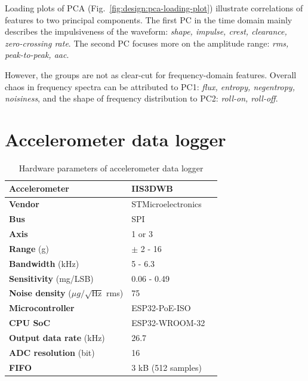 Loading plots of PCA (Fig.~\ref{fig:design:pca-loading-plot}) illustrate correlations of features to two principal components. The first PC in the time domain mainly describes the impulsiveness of the waveform: \emph{shape, impulse, crest, clearance, zero-crossing rate}. The second PC focuses more on the amplitude range: \emph{rms, peak-to-peak, aac}. 

However, the groups are not as clear-cut for frequency-domain features. Overall chaos in frequency spectra can be attributed to PC1: \emph{flux, entropy, negentropy, noisiness}, and the shape of frequency distribution to PC2: \emph{roll-on, roll-off}.


\section{Accelerometer data logger}

\begin{table}[h]
\renewcommand{\arraystretch}{1.2}
\centering
\begin{tabular}{|l|l|l|}
\hline
\textbf{Accelerometer}                           & \textbf{IIS3DWB}   \\ \hline
\textbf{Vendor}                                  & STMicroelectronics \\ \hline
\textbf{Bus}                                     & SPI                \\ \hline
\textbf{Axis}                                    & 1 or 3             \\ \hline
\textbf{Range} (g)                               & $\pm$ 2 - 16      \\ \hline
\textbf{Bandwidth} (kHz)                          & 5 - 6.3            \\ \hline
\textbf{Sensitivity} (mg/LSB)                    & 0.06 - 0.49       \\ \hline
\textbf{Noise density} ($\mu g / \sqrt{\mathrm{Hz}}$ rms) & 75                 \\ \hline
\textbf{Microcontroller}                         & ESP32-PoE-ISO      \\ \hline
\textbf{CPU SoC}                                 & ESP32-WROOM-32     \\ \hline
\textbf{Output data rate} (kHz)                  & 26.7               \\ \hline
\textbf{ADC resolution} (bit)                    & 16                 \\ \hline
\textbf{FIFO}                                    & 3 kB (512 samples) \\ \hline
\end{tabular}
\caption{Hardware parameters of accelerometer data logger}
\label{tab:design:hw-sensors}
\end{table}

